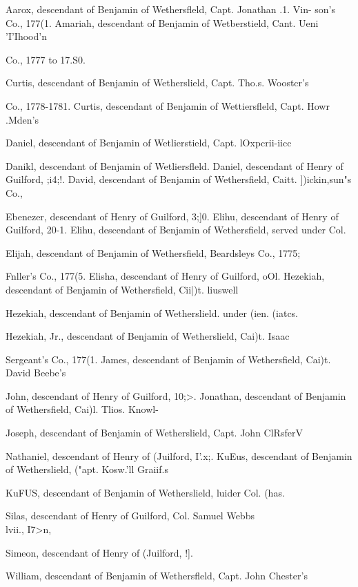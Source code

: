 \documentclass[oneside]{book}
\begin{document}
Aarox, descendant of Benjamin of Wethersfleld, Capt. Jonathan .1. Vin- 
son's Co., 177(1. 
Amariah, descendant of Benjamin of Wetberstield, Cant. Ueni 'I'Ihood'n 

Co., 1777 to 17.S0.  

Curtis, descendant of Benjamin of Wetherslield, Capt. Tho.s. Woostcr's 

Co., 1778-1781. 
Curtis, descendant of Benjamin of Wettiersfleld, Capt. Howr .Mden's 

Daniel, descendant of Benjamin of Wetlierstield, Capt. lOxpcrii-iicc 

Danikl, descendant of Benjamin of Wetliersfleld. 
Daniel, descendant of Henry of Guilford, ;i4;!. 
David, descendant of Benjamin of Wethersfield, Caitt. ])ickin,sun"s Co., 

Ebenezer, descendant of Henry of Guilford, 3;]0. 
Elihu, descendant of Henry of Guilford, 20-1. 
Elihu, descendant of Benjamin of Wethersfield, served under Col. 

Elijah, descendant of Benjamin of Wethersfield, Beardsleys Co., 1775; 

Fnller's Co., 177(5. 
Elisha, descendant of Henry of Guilford, oOl. 
Hezekiah, descendant of Benjamin of Wethersfield, Cii|)t. liuswell 

Hezekiah, descendant of Benjamin of Wetherslield. under (ien. (iatcs. 

Hezekiah, Jr., descendant of Benjamin of Wetherslield, Cai)t. Isaac 

Sergeant's Co., 177(1. 
James, descendant of Benjamin of Wethersfield, Cai)t. David Beebe's 

John, descendant of Henry of Guilford, 10;>. 
Jonathan, descendant of Benjamin of Wethersfield, Cai)l. Tlios. Knowl- 

Joseph, descendant of Benjamin of Wetherslield, Capt. John ClRsferV 

Nathaniel, descendant of Henry of (Juilford, I'.x;. 
KuEus, descendant of Benjamin of Wetherslield, ("apt. Kosw.'ll Graiif.s 

KuFUS, descendant of Benjamin of Wetherslield, luider Col. (has. 

Silas, descendant of Henry of Guilford, Col. Samuel Webbs \\lvii., I7>n, 

Simeon, descendant of Henry of (Juilford, !]. 




William, descendant of Benjamin of Wethersfleld, Capt. John Chester's 
\end{document}
